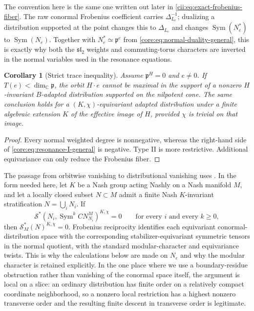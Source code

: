 \documentclass[10pt,a4paper]{amsart}
\numberwithin{equation}{section}
\newtheorem{corollary}[theorem]{Corollary}
\newcommand{\C}{\mathbb C}
\newcommand{\Sym}{\operatorname{Sym}}
\newcommand{\fp}{\mathfrak p}
\newcommand{\cS}{\mathcal S}
\begin{document}
The convention here is the same one written out later in
\eqref{cii:eq:exact-frobenius-fiber}.  The raw conormal Frobenius coefficient
carries $\Delta_{L_e}^{-1}$; dualizing a distribution supported at the point
changes this to $\Delta_{L_e}$ and changes $\Sym(N_e^*)$ to $\Sym(N_e)$.
Together with $N_e^*\simeq\fp^e$ from
\eqref{core:eq:normal-duality-general}, this is exactly why both the
$\mathfrak{sl}_2$ weights and commuting-torus characters are inverted in the
normal variables used in the resonance equations.

\begin{corollary}[Strict trace inequality]\label{core:cor:strict-trace}
Assume $\fp^H=0$ and $e\ne0$.  If $T(e)<\dim_{\C}\fp$, the orbit $H\cdot e$ cannot be
maximal in the support of a nonzero $H$-invariant $B$-adapted distribution
supported on the nilpotent cone.  The same conclusion holds for a
$(K,\chi)$-equivariant adapted distribution under a finite algebraic extension
$K$ of the effective image of $H$, provided $\chi$ is trivial on that image.
\end{corollary}

\begin{proof}
Every normal weighted degree is nonnegative, whereas the right-hand side of
\eqref{core:eq:resonance-I-general} is negative.  Type II is more restrictive.
Additional equivariance can only reduce the Frobenius fiber.
\end{proof}

The passage from orbitwise vanishing to distributional vanishing uses
\cite[Theorem~2.5.6]{AG09}.  In the form needed here, let $K$ be a Nash group
acting Nashly on a Nash manifold $M$, and let a locally closed subset
$N\subset M$ admit a finite Nash $K$-invariant stratification
$N=\bigcup_iN_i$.  If
\[
 \cS^*\!\left(N_i,\Sym^k CN_{N_i}^{M}\right)^{K,\chi}=0
 \qquad\text{for every }i\text{ and every }k\ge0,
\]
then $\cS_M^*(N)^{K,\chi}=0$.  Frobenius reciprocity
\cite[Theorem~2.5.7]{AG09} identifies each equivariant conormal-distribution
space with the corresponding stabilizer-equivariant symmetric tensors in the
normal quotient, with the standard modular-character and equivariance twists.
This is why the calculations below are made on $N_e$ and why the modular
character is retained explicitly.  In the one place where
we use a boundary-residue obstruction rather than vanishing of the conormal
space itself, the argument is local on a slice: an ordinary distribution has
finite order on a relatively compact coordinate neighborhood, so a nonzero
local restriction has a highest nonzero transverse order and the resulting
finite descent in transverse order is legitimate.
\end{document}
